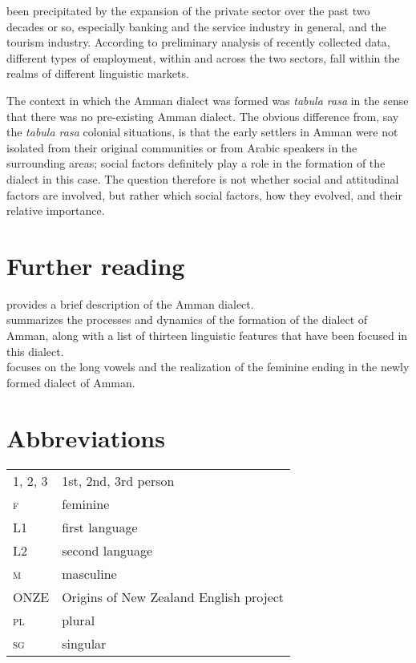 \documentclass[output=paper]{langsci/langscibook}
\begin{document}
been precipitated by the expansion of the private sector over the past two decades or so, especially banking and the service industry in general, and the tourism industry. According to preliminary analysis of recently collected data, different types of employment, within and across the two sectors, fall within the realms of different linguistic markets.

The context in which the Amman dialect was formed was \textit{tabula rasa} in the sense that there was no pre-existing Amman dialect. The obvious difference from, say the \textit{tabula rasa} colonial situations, is that the early settlers in Amman were not isolated from their original communities or from Arabic speakers in the surrounding areas; social factors definitely play a role in the formation of the dialect in this case. The question therefore is not whether social and attitudinal factors are involved, but rather which social factors, how they evolved, and their relative importance.

\section*{Further reading}

\citet{Al-Wer2011Amman} provides a brief description of the Amman dialect.\\
\citet{Al-Wer2007} summarizes the processes and dynamics of the formation of the dialect of Amman, along with a list of thirteen linguistic features that have been focused in this dialect.\\
\citet{Al-Wer2002furtherreading} focuses on the long vowels and the realization of the feminine ending in the newly formed dialect of Amman.



\section*{Abbreviations}

\begin{tabularx}{.5\textwidth}{@{}lQ@{}}
\textsc{1, 2, 3} & 1st, 2nd, 3rd person \\
\textsc{f}  &  feminine\\
L1 & first language \\
L2 & second language \\
\textsc{m}  &  masculine\\
ONZE & Origins of New Zealand English project \\
\textsc{pl}  &  plural\\
\textsc{sg}  &  singular\\
\end{tabularx}%


{\sloppy\printbibliography[heading=subbibliography,notkeyword=this]}
\end{document}
